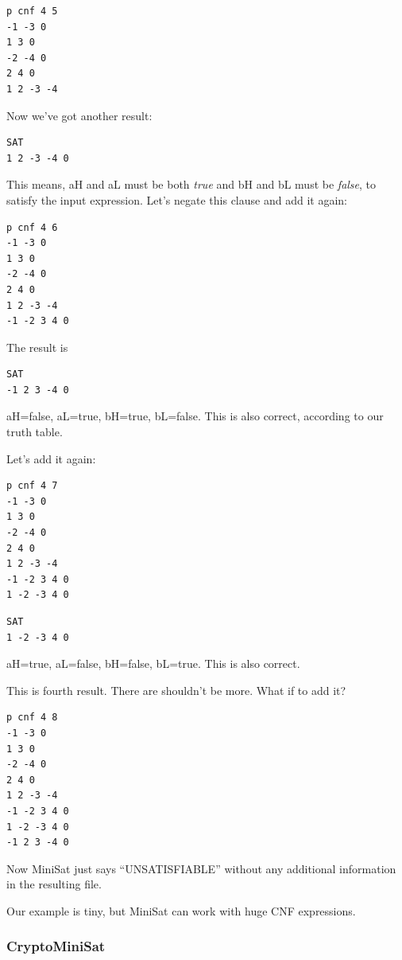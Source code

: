 \begin{lstlisting}
p cnf 4 5
-1 -3 0
1 3 0
-2 -4 0
2 4 0
1 2 -3 -4
\end{lstlisting}

Now we've got another result:

\begin{lstlisting}
SAT
1 2 -3 -4 0
\end{lstlisting}

This means, aH and aL must be both \textit{true} and bH and bL must be \textit{false}, to satisfy the input expression.
Let's negate this clause and add it again:

\begin{lstlisting}
p cnf 4 6
-1 -3 0
1 3 0
-2 -4 0
2 4 0
1 2 -3 -4
-1 -2 3 4 0
\end{lstlisting}

The result is

\begin{lstlisting}
SAT
-1 2 3 -4 0
\end{lstlisting}

aH=false, aL=true, bH=true, bL=false. This is also correct, according to our truth table.

Let's add it again:

\begin{lstlisting}
p cnf 4 7
-1 -3 0
1 3 0
-2 -4 0
2 4 0
1 2 -3 -4
-1 -2 3 4 0
1 -2 -3 4 0
\end{lstlisting}

\begin{lstlisting}
SAT
1 -2 -3 4 0
\end{lstlisting}

aH=true, aL=false, bH=false, bL=true. This is also correct.

This is fourth result. There are shouldn't be more. What if to add it?

\begin{lstlisting}
p cnf 4 8
-1 -3 0
1 3 0
-2 -4 0
2 4 0
1 2 -3 -4
-1 -2 3 4 0
1 -2 -3 4 0
-1 2 3 -4 0
\end{lstlisting}

Now MiniSat just says ``UNSATISFIABLE'' without any additional information in the resulting file.

Our example is tiny, but MiniSat can work with huge CNF expressions.

\subsubsection{CryptoMiniSat}

